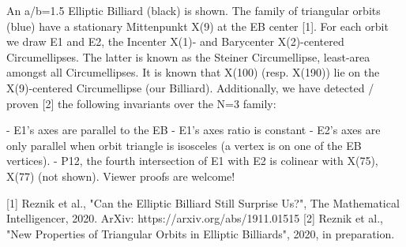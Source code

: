 An a/b=1.5 Elliptic Billiard (black) is shown. The family of triangular orbits (blue) have a stationary Mittenpunkt X(9) at the EB center [1]. For each orbit we draw E1 and E2, the Incenter X(1)- and Barycenter X(2)-centered Circumellipses. The latter is known as the Steiner Circumellipse, least-area amongst all Circumellipses. It is known that X(100) (resp. X(190)) lie on the X(9)-centered Circumellipse (our Billiard). Additionally, we have detected / proven [2] the following invariants over the N=3 family:

- E1's axes are parallel to the EB
- E1's axes ratio is constant
- E2's axes are only parallel when orbit triangle is isosceles (a vertex is on one of the EB vertices).
- P12, the fourth intersection of E1 with E2 is colinear with X(75), X(77) (not shown). Viewer proofs are welcome! 

[1] Reznik et al., "Can the Elliptic Billiard Still Surprise Us?", The Mathematical Intelligencer, 2020. ArXiv: https://arxiv.org/abs/1911.01515
[2] Reznik et al., "New Properties of Triangular Orbits in Elliptic Billiards", 2020, in preparation.